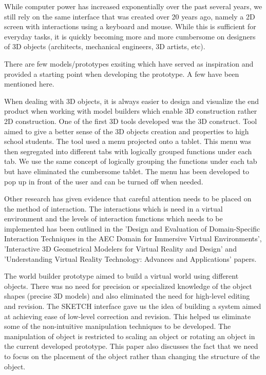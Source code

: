 While computer power has increased exponentially over the past several years, we still rely on the same interface that was created over 20 years ago, namely a 2D screen with interactions using a keyboard and mouse.
While this is sufficient for everyday tasks, it is quickly becoming more and more cumbersome on designers of 3D objects (architects, mechanical engineers, 3D artists, etc)\cite{Dekker199242}.

There are few models/prototypes exsiting which have served as inspiration and provided a starting point when developing the prototype. A few have been mentioned here.

When dealing with 3D objects, it is always easier to design and visualize the end product when working with model builders which enable 3D construction rather 2D construction. One of the first 3D tools developed was the 3D construct\cite{Kaufmann:Usability}. Tool aimed to give a better sense of the 3D objects creation and properties to high school students\cite{Kaufmann:LearningGeometry}. The tool used a menu projected onto a tablet. This menu was then segregated into different tabs with logically grouped functions under each tab. We use the same concept of logically grouping the functions under each tab but have eliminated the cumbersome tablet. The menu has been developed to pop up in front of the user and can be turned off when needed. 

Other research has given evidence that careful attention needs to be placed on the method of interaction\cite{Bowman98interactiontechniques}. The interactions which is need in a virtual environment and the levels of interaction functions which needs to be implemented has been outlined in the 'Design and Evaluation of Domain-Specific Interaction Techniques in the AEC Domain for Immersive Virtual Environments'\cite{AEC}, 'Interactive 3D Geometrical Modelers for Virtual Reality and Design'\cite{Interactive} and 'Understanding Virtual Reality Technology: Advances and Applications' \cite{AdvanceAndApplication} papers. 

The world builder prototype aimed to build a virtual world using different objects. There was no need for precision or specialized knowledge of the object shapes (precise 3D models) and also eliminated the need for high-level editing and revision. The SKETCH\cite{SKETCH} interface gave us the idea of building a system aimed at achieving ease of low-level correction and revision. This helped us eliminate some of the non-intuitive manipulation techniques to be developed. The manipulation of object is restricted to scaling an object or rotating an object in the current developed prototype. This paper also discusses the fact that we need to focus on the placement of the object rather than changing the structure of the object.

